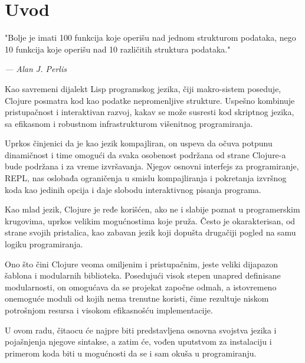 \section{Uvod}
\label{sec:uvod}

\epigraph{"Bolje je imati 100 funkcija koje operišu nad jednom strukturom podataka, nego 10 funkcija koje operišu nad 10 različitih struktura podataka."}{\textit{ --- Alan J. Perlis}}

 Kao savremeni dijalekt Lisp programskog jezika, čiji makro-sistem poseduje, Clojure posmatra kod kao podatke nepromenljive strukture. Uspešno kombinuje pristupačnost i interaktivan razvoj, kakav se može susresti kod skriptnog jezika, sa efikasnom i robustnom infrastrukturom višenitnog programiranja.
 
 Uprkos činjenici da je kao jezik kompajliran, on uspeva da očuva potpunu dinamičnost i time omogući da svaka osobenost podržana od strane Clojure-a bude podržana i za vreme izvršavanja. Njegov osnovni interfejs za programiranje, REPL, nas oslobađa ograničenja u smislu kompajliranja i pokretanja izvršnog koda kao jedinih opcija i daje slobodu interaktivnog pisanja programa.

Kao mlad jezik, Clojure je ređe korišćen, ako ne i slabije poznat u programerskim krugovima, uprkos velikim mogućnostima koje pruža. Često je okarakterisan, od strane svojih pristalica, kao zabavan jezik koji dopušta drugačiji pogled na samu logiku programiranja.

Ono što čini Clojure veoma omiljenim i pristupačnim, jeste veliki dijapazon šablona i modularnih biblioteka. Posedujući visok stepen unapred definisane modularnosti, on omogućava da se projekat započne odmah, a istovremeno onemoguće moduli od kojih nema trenutne koristi, čime rezultuje niskom potrošnjom resursa i visokom efikasnošću implementacije.

U ovom radu, čitaocu će najpre biti predstavljena osnovna svojstva jezika i pojašnjenja njegove sintakse, a zatim će, vođen uputstvom za instalaciju i primerom koda biti u mogućnosti da se i sam okuša u programiranju.